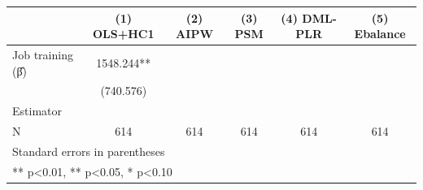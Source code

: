 \begin{table}[htbp]
\centering
\begin{tabular}{lccccc}
\hline\hline
 & (1) OLS+HC1 & (2) AIPW & (3) PSM & (4) DML-PLR & (5) Ebalance \\
\hline
Job training (β̂) & 1548.244** &  &  &  &  \\
 & (740.576) &  &  &  &  \\
\hline
Estimator &  &  &  &  &  \\
N & 614 & 614 & 614 & 614 & 614 \\
\hline\hline
\multicolumn{6}{l}{\footnotesize Standard errors in parentheses} \\
\multicolumn{6}{l}{\footnotesize *** p<0.01, ** p<0.05, * p<0.10} \\
\end{tabular}
\end{table}